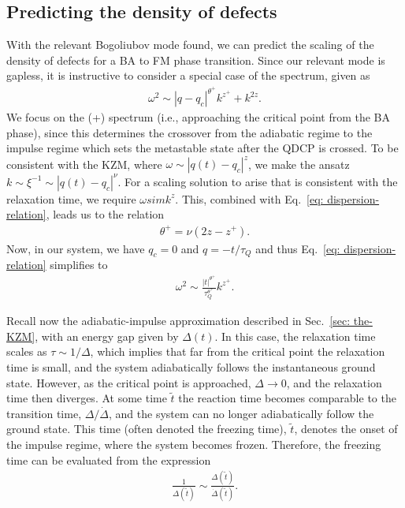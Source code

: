 \subsection{Predicting the density of defects}
With the relevant Bogoliubov mode found, we can predict the scaling of the
density of defects for a BA to FM phase transition.
Since our relevant mode is gapless, it is instructive to consider a special case
of the spectrum, given as
\begin{align}\label{eq: dispersion-relation}
    \omega^2 \sim |q-q_c|^{\theta^+}k^{z^+}+k^{2z}.
\end{align}
We focus on the (+) spectrum (i.e., approaching the critical point from the BA
phase), since this determines the crossover from the adiabatic regime to the
impulse regime which sets the metastable state after the QDCP is crossed.
To be consistent with the KZM, where \(\omega \sim |q(t)-q_c|^{z}\), we make
the ansatz \(k \sim \xi^{-1} \sim |q(t)-q_c|^{\nu}\).
For a scaling solution to arise that is consistent with the relaxation time,
we require \(\omega sim k^z\).
This, combined with Eq.~\eqref{eq: dispersion-relation}, leads us to the
relation
\begin{align}
    \theta^+ = \nu (2z-z^+).
\end{align}
Now, in our system, we have \(q_c = 0\) and \(q = -t/\tau_Q\) and thus
Eq.~\eqref{eq: dispersion-relation} simplifies to
\begin{align}\label{eq: dispersion-relation-simplified}
    \omega^2 \sim \frac{|t|^{\theta^+}}{\tau_Q^{\theta^+}}k^{z^+}.    
\end{align}

Recall now the adiabatic-impulse approximation described in
Sec.~\ref{sec: the-KZM}, with an energy gap given by \(\Delta(t)\).
In this case, the relaxation time scales as \(\tau \sim 1/\Delta \), which
implies that far from the critical point the relaxation time is small, and the
system adiabatically follows the instantaneous ground state.
However, as the critical point is approached, \(\Delta \rightarrow 0\), and the
relaxation time then diverges.
At some time \(\tilde{t}\) the reaction time becomes comparable to the
transition time, \(\Delta / \dot{\Delta}\), and the system can no longer
adiabatically follow the ground state.
This time (often denoted the freezing time), \(\tilde{t}\), denotes the onset
of the impulse regime, where the system becomes frozen.
Therefore, the freezing time can be evaluated from the expression
\begin{align}
    \frac{1}{\Delta(\tilde{t})} \sim
    \frac{\Delta(\tilde{t})}{\dot{\Delta}(\tilde{t})} .
\end{align}

